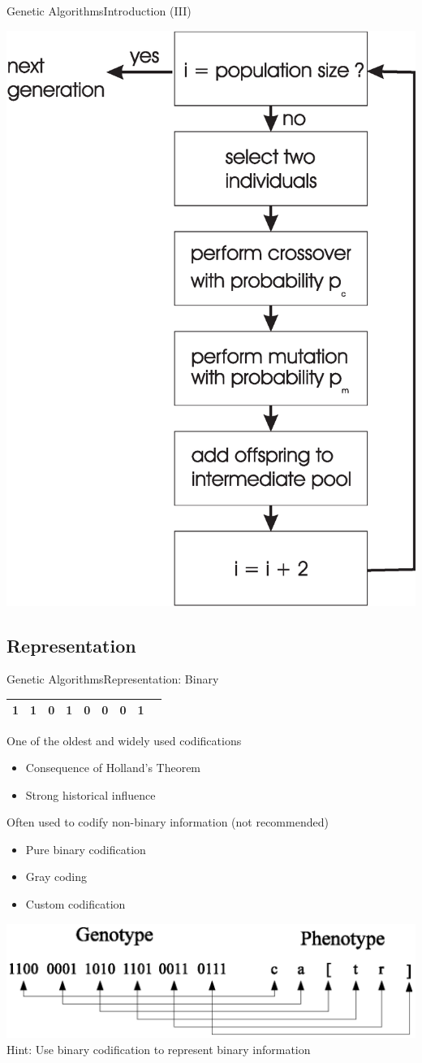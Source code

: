 \documentclass[10pt,compress]{beamer} %
\begin{document}
\begin{frame}{Genetic Algorithms}{Introduction (III)} 
	\begin{center}
		\includegraphics[height=0.5\linewidth]{figs/gaflowchart.eps}
	\end{center}
\end{frame}

\subsection{Representation}
\begin{frame}{Genetic Algorithms}{Representation: Binary}
	\vspace{-0.3cm}
	\begin{table}[]
	\centering
	\begin{tabular}{|l|l|l|l|l|l|l|l|l|}
	\hline
 	1 & 1 & 0 & 1 & 0 & 0 & 0 & 1\\ \hline
	\end{tabular}
	\end{table}

	One of the oldest and widely used codifications
	\begin{itemize}
		\item Consequence of Holland's Theorem
		\item Strong historical influence
  	\end{itemize}
	Often used to codify non-binary information (not recommended)
	\begin{itemize}
		\item Pure binary codification
		\item Gray coding
		\item Custom codification
	\end{itemize}
	\vspace{-1.5cm}
	\hfill\includegraphics[width=0.55\linewidth]{figs/coding.eps}\\
	\vspace{-0.3cm}
	Hint: Use binary codification to represent binary information
\end{frame}
\end{document}
